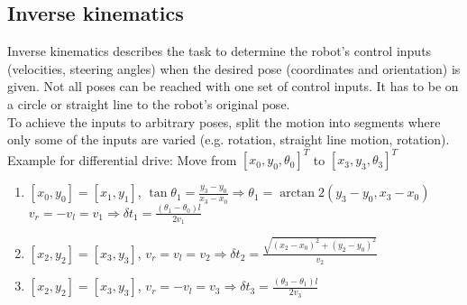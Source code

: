 \documentclass[12pt]{article}
\begin{document}
	\subsection{Inverse kinematics}
	Inverse kinematics describes the task to determine the robot's control inputs (velocities, steering angles) when the desired pose (coordinates and orientation) is given. Not all poses can be reached with one set of control inputs. It has to be on a circle or straight line to the robot's original pose.\\
	To achieve the inputs to arbitrary poses, split the motion into segments where only some of the inputs are varied (e.g. rotation, straight line motion, rotation).\\
	Example for differential drive: Move from $[x_0, y_0, \theta_0]^T$ to $[x_3, y_3, \theta_3]^T$
	\begin{enumerate}
		\item $[x_0, y_0] = [x_1, y_1]$, $\tan \theta_1 = \frac{y_3 - y_0}{x_3 - x_0} \Rightarrow \theta_1 = \arctan2(y_3 - y_0, x_3 - x_0)$\\
		$v_r = -v_l = v_1 \Rightarrow \delta t_1 = \frac{(\theta_1 - \theta_0)l}{2 v_1}$
		\item $[x_2, y_2] = [x_3, y_3]$, $v_r = v_l = v_2 \Rightarrow \delta t_2 = \frac{\sqrt{(x_2 - x_0)^2 + (y_2 - y_0)^2}}{v_2}$
		\item $[x_2, y_2] = [x_3, y_3]$, $v_r = -v_l = v_3 \Rightarrow \delta t_3 = \frac{(\theta_3 - \theta_1)l}{2 v_3}$
	\end{enumerate}
\end{document}
